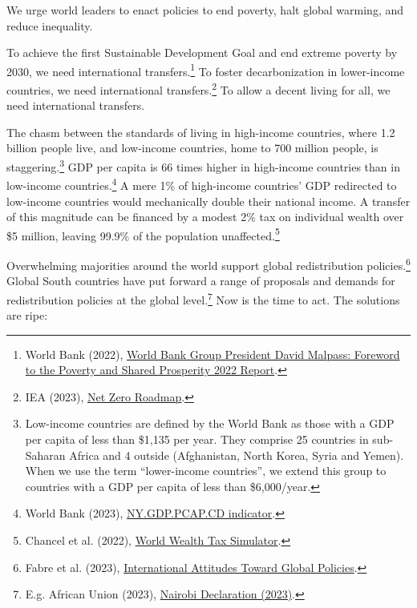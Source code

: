 \documentclass[a5paper,english,openany]{memoir}
\begin{document}
We urge world leaders to enact policies to end poverty, halt global warming, and reduce inequality. 

To achieve the first Sustainable Development Goal and end extreme poverty by 2030, we need international transfers.\footnote{World Bank (2022), \href{https://www.worldbank.org/en/news/statement/2022/10/05/world-bank-group-president-david-malpass-foreword-to-the-poverty-and-shared-prosperity-report}{World Bank Group President David Malpass: Foreword to the Poverty and Shared Prosperity 2022 Report}.} 
To foster decarbonization in lower-income countries, we need international transfers.\footnote{IEA (2023), \href{https://www.iea.org/reports/net-zero-roadmap-a-global-pathway-to-keep-the-15-0c-goal-in-reach/}{Net Zero Roadmap}.} 
To allow a decent living for all, we need international transfers.

The chasm between the standards of living in high-income countries, where 1.2 billion people live, and low-income countries, home to 700 million people, is staggering.\footnote{Low-income countries are defined by the World Bank as those with a GDP per capita of less than \$1,135 per year. They comprise 25 countries in sub-Saharan Africa and 4 outside (Afghanistan, North Korea, Syria and Yemen). When we use the term ``lower-income countries'', we extend this group to countries with a GDP per capita of less than \$6,000/year.} %
GDP per capita is 66 times higher in high-income countries than in low-income countries.\footnote{World Bank (2023), \href{https://data.worldbank.org/indicator/NY.GDP.PCAP.CD?end=2022\&locations=EU-ZG-XD-XM-1W-IN-US-CD-BI-LU-CN\&start=2022\&view=bar}{NY.GDP.PCAP.CD indicator}.} 
A mere 1\% of high-income countries' GDP redirected to low-income countries would mechanically double their national income. A transfer of this magnitude can be financed by a modest 2\% tax on individual wealth over \$5 million, leaving 99.9\% of the population unaffected.\footnote{Chancel et al. (2022), \href{https://wid.world/world-wealth-tax-simulator/}{World Wealth Tax Simulator}.}%

Overwhelming majorities around the world support global redistribution policies.\footnote{Fabre et al. (2023), \href{https://papers.ssrn.com/sol3/papers.cfm?abstract\_id=4448523}{International Attitudes Toward Global Policies}.} 
Global South countries have put forward a range of proposals and demands for redistribution policies at the global level.\footnote{E.g. African Union (2023), \href{https://media.africaclimatesummit.org/NAIROBI+Declaration+FURTHER+edited+060923+EN+920AM.pdf}{Nairobi Declaration (2023)}.} Now is the time to act. The solutions are ripe: %
\end{document}
